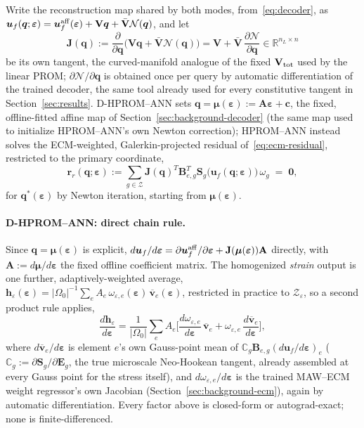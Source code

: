 \documentclass[10pt,a4paper]{article}
\begin{document}
Write the reconstruction map shared by both modes, from~\eqref{eq:decoder},
as $\bm u_f(\bm q;\bm\varepsilon)=\bm u_f^{\rm
aff}(\bm\varepsilon)+\mathbf V\bm q+\bar{\mathbf V}\mathcal N(\bm q)$, and
let
\begin{equation}
 \mathbf J(\bm q):=\frac{\partial}{\partial\bm q}\big(\mathbf V\bm
 q+\bar{\mathbf V}\mathcal N(\bm q)\big)=\mathbf V+\bar{\mathbf
 V}\,\frac{\partial\mathcal N}{\partial\bm q}\in\mathbb R^{n_L\times n}
 \label{eq:appendix-J-manifold}
\end{equation}
be its own tangent, the curved-manifold analogue of the fixed $\mathbf
V_{\rm tot}$ used by the linear PROM; $\partial\mathcal N/\partial\bm q$ is
obtained once per query by automatic differentiation of the trained
decoder, the same tool already used for every constitutive tangent in
Section~\ref{sec:results}. D-HPROM--ANN sets
$\bm q=\bm\mu(\bm\varepsilon):=\mathbf A\bm\varepsilon+\bm c$, the fixed,
offline-fitted affine map of Section~\ref{sec:background-decoder} (the same
map used to initialize HPROM--ANN's own Newton correction); HPROM--ANN
instead solves the ECM-weighted, Galerkin-projected residual
of~\eqref{eq:ecm-residual}, restricted to the primary coordinate,
\begin{equation}
 \bm r_r(\bm q;\bm\varepsilon):=\sum_{g\in\mathcal Z}\mathbf J(\bm
 q)^T\bm B_{e,g}^T\bm S_g\big(\bm u_f(\bm q;\bm\varepsilon)\big)\,\omega_g\;=\;\bm 0,
 \label{eq:appendix-rr}
\end{equation}
for $\bm q^*(\bm\varepsilon)$ by Newton iteration, starting from
$\bm\mu(\bm\varepsilon)$.

\paragraph{D-HPROM--ANN: direct chain rule.} Since $\bm q=\bm\mu(\bm\varepsilon)$
is explicit, $d\bm u_f/d\bm\varepsilon=\partial\bm u_f^{\rm
aff}/\partial\bm\varepsilon+\mathbf J(\bm\mu(\bm\varepsilon))\mathbf A$
directly, with $\mathbf A:=d\bm\mu/d\bm\varepsilon$ the fixed offline
coefficient matrix. The homogenized \emph{strain} output is one further,
adaptively-weighted average, $\bm h_\varepsilon(\bm\varepsilon)=|\Omega_0|^{-1}\sum_eA_e\,
\omega_{\varepsilon,e}(\bm\varepsilon)\,\overline{\bm v}_e(\bm\varepsilon)$,
restricted in practice to $\mathcal Z_\varepsilon$, so a
second product rule applies,
\begin{equation}
 \frac{d\bm h_\varepsilon}{d\bm\varepsilon}=\frac1{|\Omega_0|}\sum_eA_e\Big[\frac{d\omega_{\varepsilon,e}}{d\bm\varepsilon}\,\overline{\bm v}_e+\omega_{\varepsilon,e}\,\frac{d\overline{\bm v}_e}{d\bm\varepsilon}\Big],
 \label{eq:appendix-outer-chain}
\end{equation}
where $d\overline{\bm v}_e/d\bm\varepsilon$ is element $e$'s own
Gauss-point mean of $\mathbb C_g\bm B_{e,g}(d\bm u_f/d\bm\varepsilon)_e$
($\mathbb C_g:=\partial\bm S_g/\partial\bm E_g$, the true microscale
Neo-Hookean tangent, already assembled at every Gauss point for the stress
itself), and $d\omega_{\varepsilon,e}/d\bm\varepsilon$ is the trained MAW--ECM
weight regressor's own Jacobian (Section~\ref{sec:background-ecm}), again
by automatic differentiation. Every factor above is closed-form or
autograd-exact; none is finite-differenced.
\end{document}
